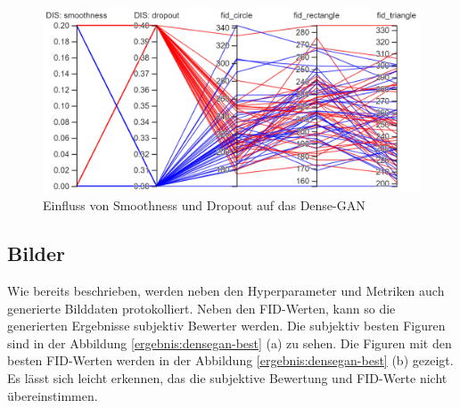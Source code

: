 \begin{figure}[H]
	\centering
	\includegraphics[width=0.6\textheight]{kapitel/5_ergebnisse/densegan/hyperparameter_dropout_smooth.PNG}
	\caption{Einfluss von Smoothness und Dropout auf das Dense-GAN}
	\label{ergebnis:densegan-hyper-smoot-drop}
\end{figure}


\subsection{Bilder}
Wie bereits beschrieben, werden neben den Hyperparameter und Metriken auch generierte Bilddaten protokolliert.
Neben den FID-Werten, kann so die generierten Ergebnisse subjektiv Bewerter werden.
Die subjektiv besten Figuren sind in der Abbildung \ref{ergebnis:densegan-best} (a) zu sehen.
Die Figuren mit den besten FID-Werten werden in der Abbildung  \ref{ergebnis:densegan-best} (b) gezeigt.
Es lässt sich leicht erkennen, das die subjektive Bewertung und FID-Werte nicht übereinstimmen.

